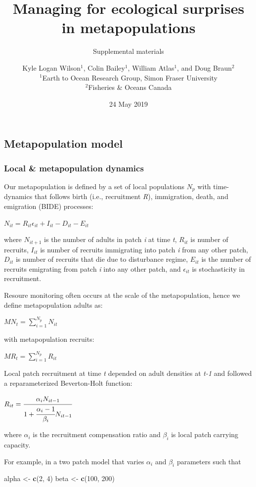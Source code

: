 \documentclass[]{article}
\title{Managing for ecological surprises in metapopulations}
\subtitle{Supplemental materials}
\author{Kyle Logan Wilson\(^1\), Colin Bailey\(^1\), William Atlas\(^1\), and
Doug Braun\(^2\)\\[2\baselineskip]\(^1\)Earth to Ocean Research Group,
Simon Fraser University\\
\(^2\)Fisheries \& Oceans Canada}
\date{24 May 2019}
\newenvironment{Shaded}{\begin{snugshade}}{\end{snugshade}}
\newcommand{\KeywordTok}[1]{\textcolor[rgb]{0.13,0.29,0.53}{\textbf{#1}}}
\newcommand{\DecValTok}[1]{\textcolor[rgb]{0.00,0.00,0.81}{#1}}
\newcommand{\StringTok}[1]{\textcolor[rgb]{0.31,0.60,0.02}{#1}}
\newcommand{\NormalTok}[1]{#1}
\begin{document}
\maketitle

\subsection{Metapopulation model}\label{metapopulation-model}

\subsubsection{Local \& metapopulation
dynamics}\label{local-metapopulation-dynamics}

Our metapopulation is defined by a set of local populations \(N_p\) with
time-dynamics that follows birth (i.e., recruitment \emph{R}),
immigration, death, and emigration (BIDE) processes:

\(N_{it}= R_{it}\epsilon_{it}+I_{it}-D_{it}-E_{it}\)

where \(N_{it+1}\) is the number of adults in patch \emph{i} at time
\emph{t}, \(R_{it}\) is number of recruits, \(I_{it}\) is number of
recruits immigrating into patch \emph{i} from any other patch,
\(D_{it}\) is number of recruits that die due to disturbance regime,
\(E_{it}\) is the number of recruits emigrating from patch \emph{i} into
any other patch, and \(\epsilon_{it}\) is stochasticity in recruitment.

Resoure monitoring often occurs at the scale of the metapopulation,
hence we define metapopulation adults as:

\({MN}_t = \sum_{i=1}^{N_p} N_{it}\)

with metapopulation recruits:

\(MR_t = \sum_{i=1}^{N_p} R_{it}\)

Local patch recruitment at time \emph{t} depended on adult densities at
\emph{t-1} and followed a reparameterized Beverton-Holt function:

\(R_{it}=\cfrac{\alpha_iN_{it-1}}{1+\cfrac{\alpha_i-1}{\beta_i}N_{it-1}}\)

where \(\alpha_i\) is the recruitment compensation ratio and \(\beta_i\)
is local patch carrying capacity.

For example, in a two patch model that varies \(\alpha_i\) and
\(\beta_i\) parameters such that

\begin{Shaded}
\begin{Highlighting}[]
\NormalTok{alpha <-}\StringTok{ }\KeywordTok{c}\NormalTok{(}\DecValTok{2}\NormalTok{, }\DecValTok{4}\NormalTok{)}
\NormalTok{beta <-}\StringTok{ }\KeywordTok{c}\NormalTok{(}\DecValTok{100}\NormalTok{, }\DecValTok{200}\NormalTok{)}
\end{Highlighting}
\end{Shaded}
\end{document}
